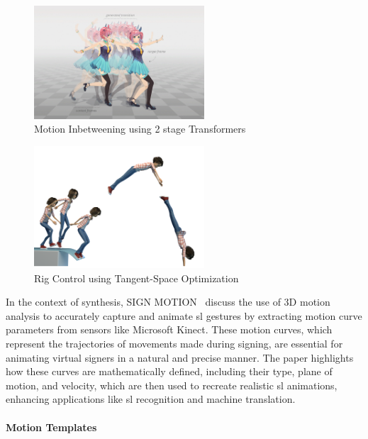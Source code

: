 \documentclass[../../main.tex]{subfiles}
\begin{document}
\begin{figure}
    \centering \includegraphics[width = 2.5in]{chapters/intermediate_blocks/images/inbetweening_transformers.jpg}
    \caption{Motion Inbetweening using 2 stage Transformers~\cite{10.1145/3306346.3322938}}
    \label{fig:inbetweening_transformers}
\end{figure}

\begin{figure}
    \centering \includegraphics[width = 2.5in]{chapters/intermediate_blocks/images/inbetweening_disney.png}
    \caption{Rig Control using Tangent-Space Optimization}
    \label{fig:inbetweening_disney}
\end{figure}

In the context of  synthesis, SIGN MOTION~\cite{inproceedings} discuss the use of 3D motion analysis to accurately capture and animate \gls{sl} gestures by extracting motion curve parameters from sensors like Microsoft Kinect. These motion curves, which represent the trajectories of movements made during signing, are essential for animating virtual signers in a natural and precise manner. The paper highlights how these curves are mathematically defined, including their type, plane of motion, and velocity, which are then used to recreate realistic \gls{sl} animations, enhancing applications like \gls{sl} recognition and machine translation.

\paragraph{Motion Templates}
\label{ch:background_work:sign_language_synthesis:3d_techniques:avatar_animation:motion_templates}
\end{document}
